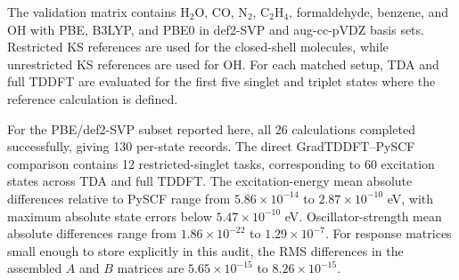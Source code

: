 The validation matrix contains H$_2$O, CO, N$_2$, C$_2$H$_4$,
formaldehyde, benzene, and OH with PBE, B3LYP, and PBE0 in def2-SVP
and aug-cc-pVDZ basis sets. Restricted KS references are used for the
closed-shell molecules, while unrestricted KS references are used for
OH. For each matched setup, TDA and full TDDFT are evaluated for the
first five singlet and triplet states where the reference calculation
is defined.

For the PBE/def2-SVP subset reported here, all 26 calculations
completed successfully, giving 130 per-state records. The direct
GradTDDFT--PySCF comparison contains 12 restricted-singlet tasks,
corresponding to 60 excitation states across TDA and full TDDFT. The
excitation-energy mean absolute differences relative to PySCF range
from \(5.86\times 10^{-14}\) to \(2.87\times 10^{-10}\) eV, with
maximum absolute state errors below \(5.47\times 10^{-10}\) eV.
Oscillator-strength mean absolute differences range from
\(1.86\times 10^{-22}\) to \(1.29\times 10^{-7}\). For response
matrices small enough to store explicitly in this audit, the RMS
differences in the assembled \(A\) and \(B\) matrices are
\(5.65\times 10^{-15}\) to \(8.26\times 10^{-15}\).

